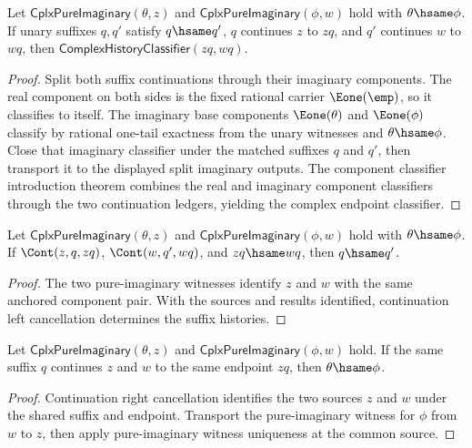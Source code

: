 \begin{theorem}
\label{thm:cplx-pure-imaginary-suffix-continuation-classifier}
Let \(\mathsf{CplxPureImaginary}(\theta,z)\) and
\(\mathsf{CplxPureImaginary}(\phi,w)\) hold with \(\theta\hsame\phi\). If
unary suffixes \(q,q'\) satisfy \(q\hsame q'\), \(q\) continues \(z\) to
\(zq\), and \(q'\) continues \(w\) to \(wq\), then
\(\mathsf{ComplexHistoryClassifier}(zq,wq)\).
\end{theorem}
\begin{proof}
Split both suffix continuations through their imaginary components. The real
component on both sides is the fixed rational carrier \(\Eone(\emp)\), so it
classifies to itself. The imaginary base components
\(\Eone(\theta)\) and \(\Eone(\phi)\) classify by rational one-tail exactness
from the unary witnesses and \(\theta\hsame\phi\). Close that imaginary
classifier under the matched suffixes \(q\) and \(q'\), then transport it to
the displayed split imaginary outputs. The component classifier introduction
theorem combines the real and imaginary component classifiers through the two
continuation ledgers, yielding the complex endpoint classifier.
\end{proof}

\begin{theorem}
\label{thm:cplx-pure-imaginary-suffix-tail-deterministic}
Let $\mathsf{CplxPureImaginary}(\theta,z)$ and
$\mathsf{CplxPureImaginary}(\phi,w)$ hold with $\theta\hsame\phi$. If
$\Cont(z,q,zq)$, $\Cont(w,q',wq)$, and $zq\hsame wq$, then $q\hsame q'$.
\end{theorem}
\begin{proof}
The two pure-imaginary witnesses identify \(z\) and \(w\) with the same
anchored component pair. With the sources and results identified, continuation
left cancellation determines the suffix histories.
\end{proof}

\begin{theorem}
\label{thm:cplx-pure-imaginary-suffix-source-deterministic}
Let $\mathsf{CplxPureImaginary}(\theta,z)$ and
$\mathsf{CplxPureImaginary}(\phi,w)$ hold. If the same suffix $q$ continues
$z$ and $w$ to the same endpoint $zq$, then $\theta\hsame\phi$.
\end{theorem}
\begin{proof}
Continuation right cancellation identifies the two sources $z$ and $w$ under
the shared suffix and endpoint. Transport the pure-imaginary witness for
$\phi$ from $w$ to $z$, then apply pure-imaginary witness uniqueness at the
common source.
\end{proof}

